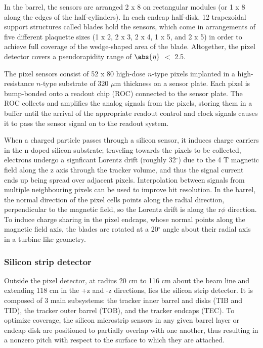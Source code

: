 In the barrel, the sensors are arranged 2 x 8 on rectangular modules (or 1 x 8 along the edges of the half-cylinders). In each endcap half-disk, 12 trapezoidal support structures called blades hold the sensors, which come in arrangements of five different plaquette sizes (1 x 2, 2 x 3, 2 x 4, 1 x 5, and 2 x 5) in order to achieve full coverage of the wedge-shaped area of the blade. Altogether, the pixel detector covers a pseudorapidity range of $\abs{\eta}$ $<$ 2.5.

The pixel sensors consist of 52 x 80 high-dose $n$-type pixels implanted in a high-resistance $n$-type substrate of 320 $\mu$m thickness on a sensor plate. Each pixel is bump-bonded onto a readout chip (ROC) connected to the sensor plate. The ROC collects and amplifies the analog signals from the pixels, storing them in a buffer until the arrival of the appropriate readout control and clock signals causes it to pass the sensor signal on to the readout system.
 
When a charged particle passes through a silicon sensor, it induces charge carriers in the n-doped silicon substrate; traveling towards the pixels to be collected, electrons undergo a signficant Lorentz drift (roughly 32$^{\circ}$) due to the 4 T magnetic field along the z axis through the tracker volume, and thus the signal current ends up being spread over adjacent pixels. Interpolation between signals from multiple neighbouring pixels can be used to improve hit resolution. In the barrel, the normal direction of the pixel cells points along the radial direction, perpendicular to the magnetic field, so the Lorentz drift is along the r$\phi$ direction. To induce charge sharing in the pixel endcaps, whose normal points along the magnetic field axis, the blades are rotated at a 20$^{\circ}$ angle about their radial axis in a turbine-like geometry.

\subsubsection{Silicon strip detector\label{sec:cms-strips}}

Outside the pixel detector, at radius 20 cm to 116 cm about the beam line and extending 118 cm in the +z and -z directions, lies the silicon strip detector. It is composed of 3 main subsystems: the tracker inner barrel and disks (TIB and TID), the tracker outer barrel (TOB), and the tracker endcaps (TEC). To optimize coverage, the silicon microstrip sensors in any given barrel layer or endcap disk are positioned to partially overlap with one another, thus resulting in a nonzero pitch with respect to the surface to which they are attached.

